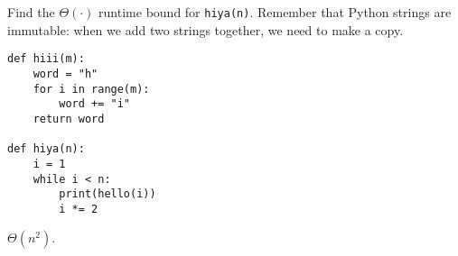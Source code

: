 \begin{blocksection}
\question Find the $\Theta(\cdot)$ runtime bound for \lstinline$hiya(n)$.  Remember that Python strings are immutable: when we add two strings together, we need to make a copy.

\begin{lstlisting}
def hiii(m):
    word = "h"
    for i in range(m):
        word += "i"
    return word

def hiya(n):
    i = 1
    while i < n:
        print(hello(i))
        i *= 2
\end{lstlisting}

\begin{solution}
$\Theta(n^2)$.
\end{solution}
\end{blocksection}
